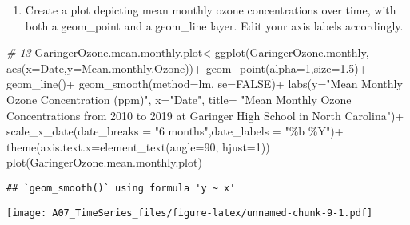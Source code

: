 \documentclass[
]{article}
\newenvironment{Shaded}{\begin{snugshade}}{\end{snugshade}}
\newcommand{\AttributeTok}[1]{\textcolor[rgb]{0.77,0.63,0.00}{#1}}
\newcommand{\CommentTok}[1]{\textcolor[rgb]{0.56,0.35,0.01}{\textit{#1}}}
\newcommand{\ConstantTok}[1]{\textcolor[rgb]{0.00,0.00,0.00}{#1}}
\newcommand{\DecValTok}[1]{\textcolor[rgb]{0.00,0.00,0.81}{#1}}
\newcommand{\FloatTok}[1]{\textcolor[rgb]{0.00,0.00,0.81}{#1}}
\newcommand{\FunctionTok}[1]{\textcolor[rgb]{0.00,0.00,0.00}{#1}}
\newcommand{\NormalTok}[1]{#1}
\newcommand{\OtherTok}[1]{\textcolor[rgb]{0.56,0.35,0.01}{#1}}
\newcommand{\SpecialCharTok}[1]{\textcolor[rgb]{0.00,0.00,0.00}{#1}}
\newcommand{\StringTok}[1]{\textcolor[rgb]{0.31,0.60,0.02}{#1}}
\providecommand{\tightlist}{%
  \setlength{\itemsep}{0pt}\setlength{\parskip}{0pt}}
\begin{document}
\begin{enumerate}
\def\labelenumi{\arabic{enumi}.}
\setcounter{enumi}{12}
\tightlist
\item
  Create a plot depicting mean monthly ozone concentrations over time,
  with both a geom\_point and a geom\_line layer. Edit your axis labels
  accordingly.
\end{enumerate}

\begin{Shaded}
\begin{Highlighting}[]
\CommentTok{\# 13}
\NormalTok{GaringerOzone.mean.monthly.plot}\OtherTok{\textless{}{-}}\FunctionTok{ggplot}\NormalTok{(GaringerOzone.monthly, }
                                        \FunctionTok{aes}\NormalTok{(}\AttributeTok{x=}\NormalTok{Date,}\AttributeTok{y=}\NormalTok{Mean.monthly.Ozone))}\SpecialCharTok{+}
                                 \FunctionTok{geom\_point}\NormalTok{(}\AttributeTok{alpha=}\DecValTok{1}\NormalTok{,}\AttributeTok{size=}\FloatTok{1.5}\NormalTok{)}\SpecialCharTok{+}
                                 \FunctionTok{geom\_line}\NormalTok{()}\SpecialCharTok{+}
                                 \FunctionTok{geom\_smooth}\NormalTok{(}\AttributeTok{method=}\NormalTok{lm, }\AttributeTok{se=}\ConstantTok{FALSE}\NormalTok{)}\SpecialCharTok{+}
                                 \FunctionTok{labs}\NormalTok{(}\AttributeTok{y=}\StringTok{"Mean Monthly Ozone Concentration (ppm)"}\NormalTok{, }\AttributeTok{x=}\StringTok{"Date"}\NormalTok{,}
                                 \AttributeTok{title=}
          \StringTok{"Mean Monthly Ozone Concentrations from 2010 to 2019 at Garinger High School in North Carolina"}\NormalTok{)}\SpecialCharTok{+}
  \FunctionTok{scale\_x\_date}\NormalTok{(}\AttributeTok{date\_breaks =} \StringTok{"6 months"}\NormalTok{,}\AttributeTok{date\_labels =} \StringTok{"\%b \%Y"}\NormalTok{)}\SpecialCharTok{+}
  \FunctionTok{theme}\NormalTok{(}\AttributeTok{axis.text.x=}\FunctionTok{element\_text}\NormalTok{(}\AttributeTok{angle=}\DecValTok{90}\NormalTok{, }\AttributeTok{hjust=}\DecValTok{1}\NormalTok{))}
\FunctionTok{plot}\NormalTok{(GaringerOzone.mean.monthly.plot)}
\end{Highlighting}
\end{Shaded}

\begin{verbatim}
## `geom_smooth()` using formula 'y ~ x'
\end{verbatim}

\texttt{[image: A07\_TimeSeries\_files/figure-latex/unnamed-chunk-9-1.pdf]}
\end{document}
